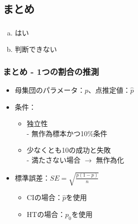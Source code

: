 
\subsection{まとめ}


\begin{frame}
\frametitle{}


\begin{enumerate}[(a)]
\item はい
\item 判断できない
\end{enumerate}

\end{frame}


\begin{frame}
\frametitle{まとめ - 1つの割合の推測}

\begin{itemize}

\item 母集団のパラメータ：$p$、点推定値：$\hat{p}$

\item 条件：
\begin{itemize}
\item 独立性 \\
- 無作為標本かつ10\%条件
\item 少なくとも10の成功と失敗\\ - 満たさない場合 $\rightarrow$ 無作為化
\end{itemize}

\item 標準誤差：$SE = \sqrt{ \frac{p(1-p)}{n} }$
\begin{itemize}
\item CIの場合：$\hat{p}$を使用
\item HTの場合：$p_0$を使用
\end{itemize}

\end{itemize}

\end{frame}
